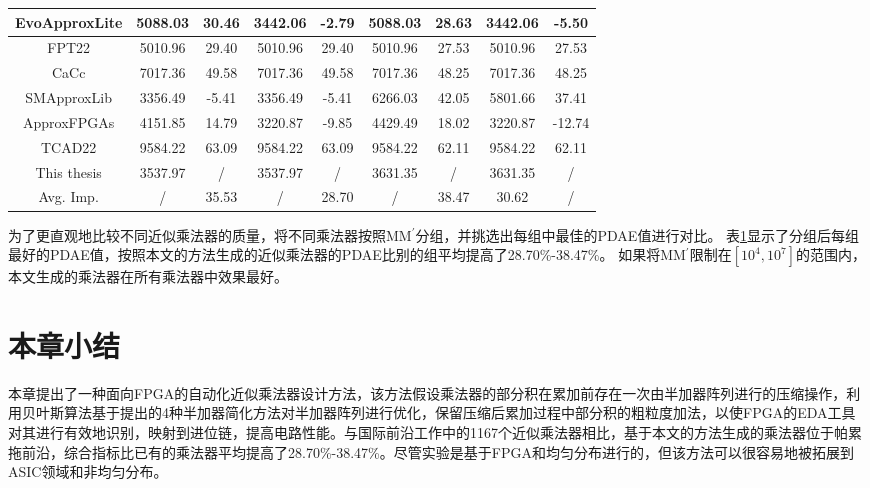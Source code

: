 \begin{table}[!htbp]
\begin{center}
{\begin{tabular}{|c|c|c|c|c|c|c|c|c|}
        \hline
        EvoApproxLite \cite{AC:AM:CGP_EvoLite} & 5088.03 & 30.46 & 3442.06 & -2.79 & 5088.03 & 28.63 & 3442.06 & -5.50 \\
        \hline
        FPT22 \cite{AC:AM:FPGA:FPT22} & 5010.96 & 29.40 & 5010.96 & 29.40 & 5010.96 & 27.53 & 5010.96 & 27.53 \\
        \hline
        CaCc \cite{AC:AM:FPGA:CaCc} & 7017.36 & 49.58 & 7017.36 & 49.58 & 7017.36 & 48.25 & 7017.36 & 48.25 \\
        \hline
        SMApproxLib \cite{AC:AM:FPGA:SMApproxLib} & 3356.49 & -5.41 & 3356.49 & -5.41 & 6266.03 & 42.05 & 5801.66 & 37.41 \\
        \hline
        ApproxFPGAs \cite{AC:AM:FPGA:ApproxFPGAs} & 4151.85 & 14.79 & 3220.87 & -9.85 & 4429.49 & 18.02 & 3220.87 & -12.74 \\
        \hline
        TCAD22 \cite{AC:AM:FPGA:TCAD22} & 9584.22 & 63.09 & 9584.22 & 63.09 & 9584.22 & 62.11 & 9584.22 & 62.11 \\
        \hline
        This thesis & 3537.97 & / & 3537.97 & / & 3631.35 & / & 3631.35 & / \\
        \hline
        Avg. Imp. & / & 35.53 & / & 28.70 & / & 38.47 & 30.62 & / \\
        \hline
        \end{tabular}
    }
        \label{AC:AM:FPGA:AMG:Table:PDAE}
        \end{center}
\end{table}


为了更直观地比较不同近似乘法器的质量，将不同乘法器按照MM$^\prime$分组，并挑选出每组中最佳的PDAE值进行对比。
表\ref{AC:AM:FPGA:AMG:Table:PDAE}显示了分组后每组最好的PDAE值，按照本文的方法生成的近似乘法器的PDAE比别的组平均提高了28.70\%-38.47\%。
如果将MM$^\prime$限制在$[10^4,10^7]$的范围内，本文生成的乘法器在所有乘法器中效果最好。


\section{本章小结}

本章提出了一种面向FPGA的自动化近似乘法器设计方法，该方法假设乘法器的部分积在累加前存在一次由半加器阵列进行的压缩操作，利用贝叶斯算法基于提出的4种半加器简化方法对半加器阵列进行优化，保留压缩后累加过程中部分积的粗粒度加法，以使FPGA的EDA工具对其进行有效地识别，映射到进位链，提高电路性能。与国际前沿工作中的1167个近似乘法器相比，基于本文的方法生成的乘法器位于帕累拖前沿，综合指标比已有的乘法器平均提高了28.70\%-38.47\%。尽管实验是基于FPGA和均匀分布进行的，但该方法可以很容易地被拓展到ASIC领域和非均匀分布。

